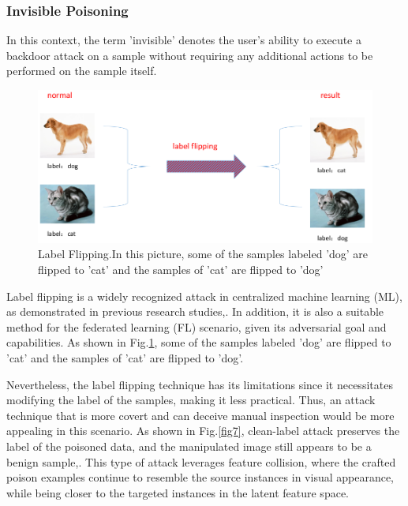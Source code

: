\documentclass[conference]{IEEEtran}
\begin{document}
\subsubsection{Invisible Poisoning}
In this context, the term 'invisible' denotes the user's ability to execute
a backdoor attack on a sample without requiring any additional actions to
be performed on the sample itself.


\begin{figure}[htbp]
    \centerline{\includegraphics[width=0.8\linewidth,height=0.5\linewidth]{picture/f6.png}}
    \caption{Label Flipping.In this picture, some of the samples labeled 'dog' are flipped to 'cat' and the samples of 'cat'
    are flipped to 'dog'}
    \label{fig6}
\end{figure}

Label flipping is a widely recognized attack in centralized machine learning (ML),
as demonstrated in previous research studies\cite{b54},\cite{b55}. In addition,
it is also a suitable method for the federated learning (FL) scenario,
given its adversarial goal and capabilities\cite{b56}.
As shown in Fig.\ref{fig6}, some of the samples labeled 'dog' are flipped to 'cat' and the samples of 'cat'
are flipped to 'dog'.


Nevertheless, the label flipping technique has its limitations since it necessitates
modifying the label of the samples, making it less practical. 
Thus, an attack technique that is more covert and can deceive manual inspection would be more
appealing in this scenario.
As shown in Fig.\ref{fig7}, clean-label attack preserves the label of the poisoned data,
and the manipulated image still appears to be a benign sample\cite{b57},\cite{b58}. This type of attack
leverages feature collision, where the crafted poison examples continue to
resemble the source instances in visual appearance, while being closer to the
targeted instances in the latent feature space.
\end{document}
